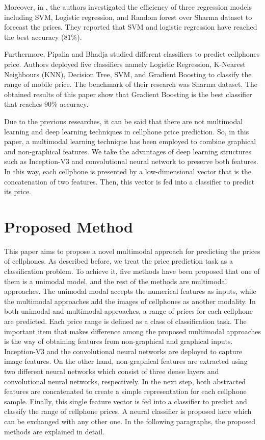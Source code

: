 \documentclass{svjour3}                     \smartqed  \usepackage{graphicx}
\begin{document}
Moreover, in \cite{Subhiksha2020}, the authors investigated the efficiency of three regression models including SVM, Logistic regression, and Random forest over Sharma dataset to forecast the prices.  They reported that SVM and logistic regression have reached the best accuracy ($81\%$). 

Furthermore, Pipalia and Bhadja \cite{Pipalia2020} studied different classifiers to predict cellphones price. Authors deployed five classifiers namely Logistic Regression, K-Nearest Neighbours (KNN), Decision Tree, SVM, and Gradient Boosting to classify the range of mobile price. The benchmark of their research was Sharma dataset. The obtained results of this paper show that Gradient Boosting is the best classifier that reaches $90\%$ accuracy. 

Due to the previous researches, it can be said that there are not multimodal learning and deep learning techniques in cellphone price prediction. So, in this paper, a multimodal learning technique has been employed to combine graphical and non-graphical features. We take the advantages of deep learning structures such as Inception-V3 and convolutional neural network to preserve both features. In this way, each cellphone is presented by a low-dimensional vector that is the concatenation of two features. Then, this vector is fed into a classifier to predict its price. 
\section{Proposed Method} \label{Sec:Method}
This paper aims to propose a novel multimodal approach for predicting the prices of cellphones. As described before, we treat the price prediction task as a classification problem. To achieve it, five methods have been proposed that one of them is a unimodal model, and the rest of the methods are multimodal approaches. The unimodal modal accepts the numerical features as inputs, while the multimodal approaches add the images of cellphones as another modality.  In both unimodal and multimodal approaches, a range of prices for each cellphone are predicted. Each price range is defined as a class of classification task. The important item that makes difference among the proposed multimodal approaches is the way of obtaining features from non-graphical and graphical inputs. Inception-V3 and the convolutional neural networks are deployed to capture image features. On the other hand, non-graphical features are extracted using two different neural networks which consist of three dense layers and convolutional neural networks, respectively. In the next step, both abstracted features are concatenated to create a simple representation for each cellphone sample. Finally, this single feature vector is fed into a classifier to predict and classify the range of cellphone prices. A neural classifier is proposed here which can be exchanged with any other one. In the following paragraphs, the proposed methods are explained in detail. 
\end{document}
